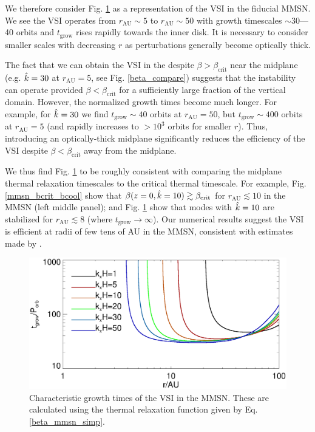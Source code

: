 
We therefore consider Fig. \ref{mmsn_overall} as a representation of the
VSI in the fiducial MMSN. We see the VSI operates from $r_\mathrm{AU}\sim 5$ to $r_\mathrm{AU}\sim
50$ with growth timescales $\sim 30$---40 orbits and 
$t_\mathrm{grow}$ rises rapidly towards the inner disk. It is
necessary to consider smaller scales with decreasing $r$ as
perturbations generally become optically thick.   

The fact that we can obtain the VSI in the despite $\beta >
\beta_\mathrm{crit}$ near the midplane (e.g. $\hat{k} = 30$ at
$r_\mathrm{AU} =5$, see Fig. \ref{beta_compare}) suggests  that the instability
can operate provided $\beta < \beta_\mathrm{crit}$ for a sufficiently large
fraction of the vertical domain. However, the normalized growth times
become much longer. For example, for $\hat{k}=30$ we find
$t_\mathrm{grow}\sim 40$ orbits at $r_\mathrm{AU}=50$, but $t_\mathrm{grow}\sim
400$ orbits at $r_\mathrm{AU}=5$ (and rapidly increases to $> 10^3$ orbits for
smaller $r$). Thus, introducing an optically-thick midplane 
significantly reduces the efficiency of the VSI despite $\beta <
\beta_\mathrm{crit}$ away from the midplane. 


We thus find Fig. \ref{mmsn_overall} to be roughly consistent with
comparing the midplane thermal relaxation timescales to the critical
thermal timescale. For example, 
Fig. \ref{mmsn_bcrit_bcool} show that $\beta(z=0,\hat{k}=10) \gtrsim
\beta_\mathrm{crit}$ for $r_\mathrm{AU}\lesssim 10$ in the MMSN (left middle
panel); and Fig. \ref{mmsn_overall} 
show that modes with $\hat{k}=10$ are stabilized for $r_\mathrm{AU}\lesssim 8$ (where
$t_\mathrm{grow}\to\infty$). Our numerical results suggest the VSI
is efficient at radii of few tens of AU in the MMSN, consistent with
estimates made by . 

\begin{figure}
  \includegraphics[width=\linewidth]{figures/eigen_compare_grow.ps}
  \caption{Characteristic growth times of the VSI in 
    the MMSN. These are calculated using the thermal relaxation
    function given by Eq. \ref{beta_mmsn_simp}. 
    \label{mmsn_overall}}    
\end{figure}
